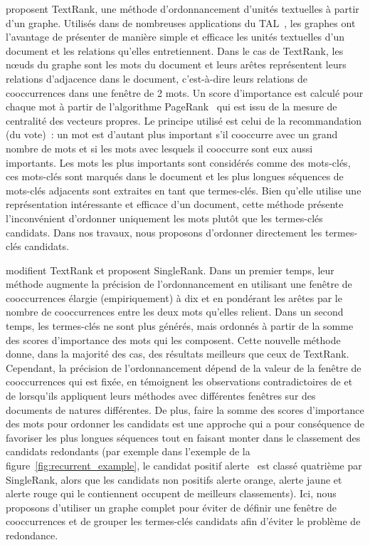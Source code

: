     proposent TextRank, une méthode
    d'ordonnancement d'unités textuelles à partir d'un graphe. Utilisés dans de
    nombreuses applications du TAL~\cite{kozareva2013textgraphs}, les graphes
    ont l'avantage de présenter de manière simple et efficace les unités
    textuelles d'un document et les relations qu'elles entretiennent. Dans le
    cas de TextRank, les n\oe{}uds du graphe sont les mots du document et leurs
    arêtes représentent leurs relations d'adjacence dans le document,
    c'est-à-dire leurs relations de cooccurrences dans une fenêtre de 2 mots. Un
    score d'importance est calculé pour chaque mot à partir de l'algorithme
    PageRank~\cite{brin1998pagerank} qui est issu de la mesure de centralité des
    vecteurs propres. Le principe utilisé est celui de la recommandation (du
    vote)~: un mot est d'autant plus important s'il cooccurre avec un grand
    nombre de mots et si les mots avec lesquels il cooccurre sont eux aussi
    importants. Les mots les plus importants sont considérés comme des mots-clés,
    ces mots-clés sont marqués dans le document et les plus longues séquences de
    mots-clés adjacents sont extraites en tant que termes-clés. Bien qu'elle
    utilise une représentation intéressante et efficace d'un document, cette
    méthode présente l'inconvénient d'ordonner uniquement les mots plutôt que
    les termes-clés candidats. Dans nos travaux, nous proposons d'ordonner
    directement les termes-clés candidats.

     modifient TextRank et proposent SingleRank. Dans
    un premier temps, leur méthode augmente la précision de l'ordonnancement en
    utilisant une fenêtre de cooccurrences élargie (empiriquement) à dix et en
    pondérant les arêtes par le nombre de cooccurrences entre les deux mots
    qu'elles relient. Dans un second temps, les termes-clés ne sont plus
    générés, mais ordonnés à partir de la somme des scores d'importance des mots
    qui les composent. Cette nouvelle méthode donne, dans la majorité des cas,
    des résultats meilleurs que ceux de TextRank. Cependant, la précision de
    l'ordonnancement dépend de la valeur de la fenêtre de cooccurrences qui est
    fixée, en témoignent les observations contradictoires de
     et de  lorsqu'ils
    appliquent leurs méthodes avec différentes fenêtres sur des documents de
    natures différentes. De plus, faire la somme des scores d'importance des
    mots pour ordonner les candidats est une approche qui a pour conséquence de
    favoriser les plus longues séquences tout en faisant monter dans le
    classement des candidats redondants (par exemple dans l'exemple de la
    figure~\ref{fig:recurrent_example}, le
    candidat positif \og{}alerte~\fg{} est classé quatrième par SingleRank,
    alors que les candidats non positifs \og{}alerte orange\fg{}, \og{}alerte
    jaune\fg{} et \og{}alerte rouge\fg{} qui le contiennent occupent de
    meilleurs classements). Ici, nous proposons d'utiliser un graphe complet
    pour éviter de définir une fenêtre de cooccurrences et de grouper les
    termes-clés candidats afin d'éviter le problème de redondance.

